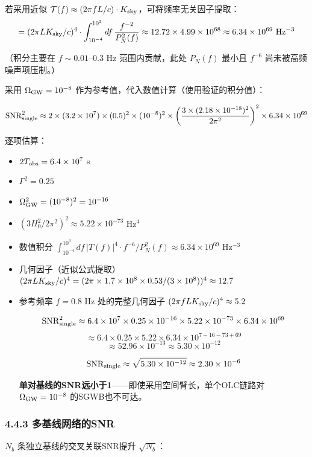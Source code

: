 \documentclass[12pt,a4paper]{article}
\begin{document}
若采用近似 $\mathcal{T}(f) \approx (2\pi f L/c) \cdot K_{\rm sky}$，可将频率无关因子提取：
$$= (2\pi L K_{\rm sky}/c)^4 \cdot \int_{10^{-4}}^{10^3} df\, \frac{f^{-2}}{P_N^2(f)} \approx 12.72 \times 4.99 \times 10^{68} \approx 6.34 \times 10^{69} \ {\rm Hz^{-3}}$$

（积分主要在 $f \sim 0.01$–0.3 Hz 范围内贡献，此处 $P_N(f)$ 最小且 $f^{-6}$ 尚未被高频噪声项压制。）

采用 $\Omega_{\rm GW} = 10^{-8}$ 作为参考值，代入数值计算（使用验证的积分值）：

$${\rm SNR}_{\rm single}^2 \approx 2 \times (3.2 \times 10^7) \times (0.5)^2 \times (10^{-8})^2 \times \left(\frac{3 \times (2.18 \times 10^{-18})^2}{2\pi^2}\right)^2 \times 6.34 \times 10^{69}$$

逐项估算：
\begin{itemize}
  \item $2T_{\rm obs} = 6.4 \times 10^7$ s
  \item $\Gamma^2 = 0.25$
  \item $\Omega_{\rm GW}^2 = (10^{-8})^2 = 10^{-16}$
  \item $(3H_0^2/2\pi^2)^2 \approx 5.22 \times 10^{-73}$ Hz$^4$
  \item 数值积分 $\int_{10^{-4}}^{10^3} df\, |T(f)|^4 \cdot f^{-6}/P_N^2(f) \approx 6.34 \times 10^{69}$ Hz$^{-3}$
  \item 几何因子（近似公式提取）$(2\pi L K_{\rm sky}/c)^4 = (2\pi \times 1.7\times 10^8 \times 0.53/(3\times 10^8))^4 \approx 12.7$
  \item 参考频率 $f = 0.8$ Hz 处的完整几何因子 $(2\pi f L K_{\rm sky}/c)^4 \approx 5.2$

$${\rm SNR}_{\rm single}^2 \approx 6.4 \times 10^7 \times 0.25 \times 10^{-16} \times 5.22 \times 10^{-73} \times 6.34 \times 10^{69}$$
$$\approx 6.4 \times 0.25 \times 5.22 \times 6.34 \times 10^{7-16-73+69}$$
$$\approx 52.96 \times 10^{-13} \approx 5.30 \times 10^{-12}$$

$${\rm SNR}_{\rm single} \approx \sqrt{5.30 \times 10^{-12}} \approx 2.30 \times 10^{-6}$$

\textbf{单对基线的SNR远小于1}——即使采用空间臂长，单个OLC链路对 $\Omega_{\rm GW} = 10^{-8}$ 的SGWB也不可达。
\end{itemize}
\subsubsection{4.4.3 多基线网络的SNR}


$N_b$ 条独立基线的交叉关联SNR提升 $\sqrt{N_b}$：
\end{document}
